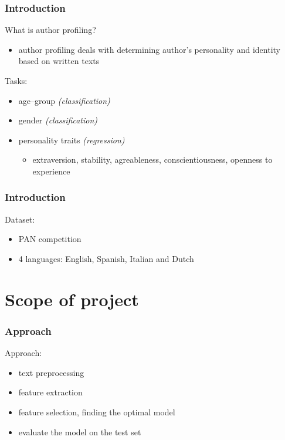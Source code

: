 \documentclass[utf8]{beamer}
\begin{document}
\begin{frame}
	\frametitle{Introduction}
	What is author profiling?
	\pause
	\begin{itemize}
		\item author profiling deals with determining author's personality and identity based on written texts
	\end{itemize}
		\pause
	\vspace{20px}
	Tasks:
	\pause
	\begin{itemize}
		\item age--group \textit{(classification)}
		\item gender \textit{(classification)}
		\item personality traits \textit{(regression)}
		\begin{itemize}
			\item extraversion, stability, agreableness, conscientiousness, openness to experience
		\end{itemize}
	\end{itemize}
\end{frame}


\begin{frame}
	\frametitle{Introduction}
	Dataset:
	\pause
	\begin{itemize}
		\item PAN competition
		\item 4 languages: English, Spanish, Italian and Dutch
	\end{itemize}
\end{frame}



\section{Scope of project}

\begin{frame}
	\frametitle{Approach}
	Approach:
	\pause
	\begin{itemize}
		\item text preprocessing
		\item feature extraction
		\item feature selection, finding the optimal model
		\item evaluate the model on the test set
	\end{itemize}
\end{frame}
\end{document}
